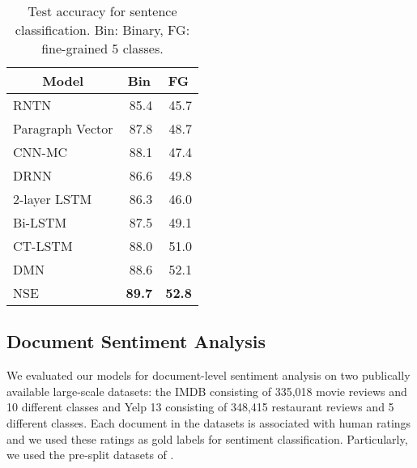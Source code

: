 \documentclass{article}
\begin{document}
\begin{table}[t]
\begin{center}
\small
\begin{tabular}{c|c|c}
\hline 
Model & Bin & FG \\
\hline
\multicolumn{1}{l|}{RNTN \cite{socher2013recursive}} & \multicolumn{1}{|r|}{85.4} & \multicolumn{1}{|r}{45.7} \\
\multicolumn{1}{l|}{Paragraph Vector \cite{le2014}} & \multicolumn{1}{|r|}{87.8} & \multicolumn{1}{|r}{48.7} \\
\multicolumn{1}{l|}{CNN-MC \cite{kim:13}} & \multicolumn{1}{|r|}{88.1} & \multicolumn{1}{|r}{47.4} \\
\multicolumn{1}{l|}{DRNN \cite{irsoy15}} & \multicolumn{1}{|r|}{86.6} & \multicolumn{1}{|r}{49.8} \\
\multicolumn{1}{l|}{2-layer LSTM\cite{tai2015improved}} & \multicolumn{1}{|r|}{86.3} & \multicolumn{1}{|r}{46.0} \\
\multicolumn{1}{l|}{Bi-LSTM\cite{tai2015improved}} & \multicolumn{1}{|r|}{87.5} & \multicolumn{1}{|r}{49.1} \\
\multicolumn{1}{l|}{CT-LSTM\cite{tai2015improved}} & \multicolumn{1}{|r|}{88.0} & \multicolumn{1}{|r}{51.0} \\
\multicolumn{1}{l|}{DMN \cite{ankit16}} & \multicolumn{1}{|r|}{88.6} & \multicolumn{1}{|r}{52.1} \\
\multicolumn{1}{l|}{NSE} & \multicolumn{1}{|r|}{\bf 89.7} & \multicolumn{1}{|r}{\bf 52.8} \\
\hline
\end{tabular}
\end{center}
\caption{\label{table:sent}Test accuracy for sentence classification. Bin: Binary, FG: fine-grained 5 classes.}
\end{table}

\subsection{Document Sentiment Analysis}

We evaluated our models for document-level sentiment analysis on two publically available large-scale datasets: the IMDB  consisting of 335,018 movie reviews and 10 different classes and Yelp 13 consisting of 348,415 restaurant reviews and 5 different classes. Each document in the datasets is associated with human ratings and we used these ratings as gold labels for sentiment classification. Particularly, we used the pre-split datasets of \cite{tang:15}. 
\end{document}
